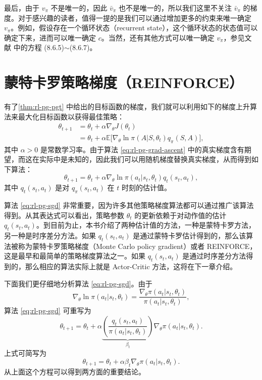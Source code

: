 最后，由于 $v_{\pi}$ 不是唯一的，因此 $\bar{v}_{\pi}$ 也不是唯一的，所以我们这里不关注 $\bar{v}_{\pi}$ 的梯度。对于感兴趣的读者，值得一提的是我们可以通过增加更多的约束来唯一确定 $v_{\pi}$。例如，假设存在一个循环状态（recurrent state），这个循环状态的状态值可以确定下来，进而可以唯一确定 $c$。当然，还有其他方式可以唯一确定 $v_{\pi}$，参见文献  中的方程 (8.6.5)$\sim$(8.6.7)。

\section{蒙特卡罗策略梯度（REINFORCE）}
\label{sec:rl-pg-reinforce}

有了\cref{thm:rl-pg-pgt} 中给出的目标函数的梯度，我们就可以利用如下的梯度上升算法来最大化目标函数以获得最佳策略：
\begin{equation}
\begin{aligned}
\theta_{t+1} &= \theta_t + \alpha \nabla_{\theta} J(\theta_t) \\
&= \theta_t + \alpha \mathbb{E}\Big[ \nabla_{\theta} \ln \pi(A|S,\theta_t) q_{\pi}(S,A) \Big],
\end{aligned}
\label{eq:rl-pg-grad-ascent}
\end{equation}
其中 $\alpha > 0$ 是常数学习率。由于算法 \eqref{eq:rl-pg-grad-ascent} 中的真实梯度含有期望，而这在实际中是未知的，因此我们可以用随机梯度替换真实梯度，从而得到如下算法：
\begin{equation}
\theta_{t+1} = \theta_t + \alpha \nabla_{\theta} \ln \pi(a_t|s_t,\theta_t) q_t(s_t,a_t),
\label{eq:rl-pg-sgd}
\end{equation}
其中 $q_t(s_t,a_t)$ 是对 $q_{\pi}(s_t,a_t)$ 在 $t$ 时刻的估计值。

算法 \eqref{eq:rl-pg-sgd} 非常重要，因为许多其他策略梯度算法都可以通过推广该算法得到。从其表达式可以看出，策略参数 $\theta_t$ 的更新依赖于对动作值的估计 $q_t(s_t,a_t)$。到目前为止，本书介绍了两种估计值的方法，一种是蒙特卡罗方法，另一种是时序差分方法。如果 $q_t(s_t,a_t)$ 是通过蒙特卡罗估计得到的，那么该算法被称为蒙特卡罗策略梯度（Monte Carlo policy gradient）或者 REINFORCE，这是最早和最简单的策略梯度算法之一。如果 $q_t(s_t,a_t)$ 是通过时序差分方法得到的，那么相应的算法实际上就是 Actor-Critic 方法，这将在下一章介绍。

下面我们更仔细地分析算法 \eqref{eq:rl-pg-sgd}。由于
\begin{equation}
\nabla_{\theta} \ln \pi(a_t|s_t,\theta_t) = \frac{\nabla_{\theta} \pi(a_t|s_t,\theta_t)}{\pi(a_t|s_t,\theta_t)},
\end{equation}
算法 \eqref{eq:rl-pg-sgd} 可重写为
\begin{equation}
\theta_{t+1} = \theta_t + \alpha \underbrace{\left(\frac{q_t(s_t,a_t)}{\pi(a_t|s_t,\theta_t)}\right)}_{\beta_t} \nabla_{\theta} \pi(a_t|s_t,\theta_t).
\end{equation}
上式可简写为
\begin{equation}
\theta_{t+1} = \theta_t + \alpha \beta_t \nabla_{\theta} \pi(a_t|s_t,\theta_t).
\label{eq:rl-pg-beta-update}
\end{equation}
从上面这个方程可以得到两方面的重要结论。

